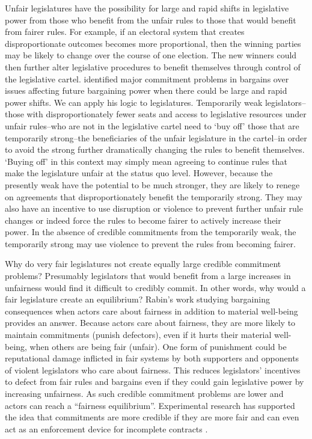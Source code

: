 \documentclass[a4paper]{article}\usepackage[]{graphicx}\usepackage[]{color}
\begin{document}
Unfair legislatures have the possibility for large and rapid shifts in legislative power from those who benefit from the unfair rules to those that would benefit from fairer rules. For example, if an electoral system that creates disproportionate outcomes becomes more proportional, then the winning parties may be likely to change over the course of one election. The new winners could then further alter legislative procedures to benefit themselves through control of the legislative cartel. \cite{Powell2004,Powell2006} identified major commitment problems in bargains over issues affecting future bargaining power when there could be large and rapid power shifts. We can apply his logic to legislatures. Temporarily weak legislators--those with disproportionately fewer seats and access to legislative resources under unfair rules--who are not in the legislative cartel need to `buy off' those that are temporarily strong--the beneficiaries of the unfair legislature in the cartel--in order to avoid the strong further dramatically changing the rules to benefit themselves. `Buying off' in this context may simply mean agreeing to continue rules that make the legislature unfair at the status quo level. However, because the presently weak have the potential to be much stronger, they are likely to renege on agreements that disproportionately benefit the temporarily strong. They may also have an incentive to use disruption or violence to prevent further unfair rule changes or indeed force the rules to become fairer to actively increase their power. In the absence of credible commitments from the temporarily weak, the temporarily strong may use violence to prevent the rules from becoming fairer.

Why do very fair legislatures not create equally large credible commitment problems? Presumably legislators that would benefit from a large increases in unfairness would find it difficult to credibly commit. In other words, why would a fair legislature create an equilibrium? Rabin's \citeyearpar{Rabin1993} work studying bargaining consequences when actors care about fairness in addition to material well-being provides an answer. Because actors care about fairness, they are more likely to maintain commitments (punish defectors), even if it hurts their material well-being, when others are being fair (unfair). One form of punishment could be reputational damage inflicted in fair systems by both supporters and opponents of violent legislators who care about fairness. This reduces legislators' incentives to defect from fair rules and bargains even if they could gain legislative power by increasing unfairness. As such credible commitment problems are lower and actors can reach a ``fairness equilibrium''. Experimental research has supported the idea that commitments are more credible if they are more fair \citep{Ellingsen2004} and can even act as an enforcement device for incomplete contracts \citep[see][for a review]{Fehr2008}.  
\end{document}
